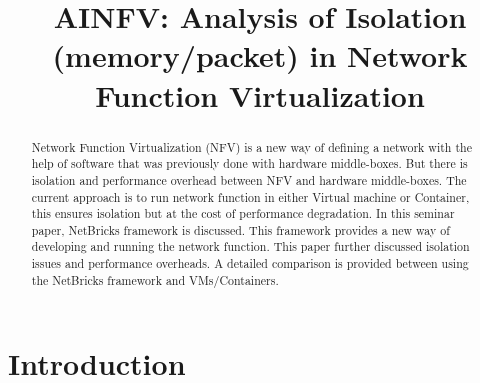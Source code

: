 \documentclass[10pt, a4paper, conference]{IEEEtran}
\begin{document}

\title{AINFV: Analysis of Isolation (memory/packet) in Network Function Virtualization }
% 


\author{
  
}

\maketitle

\begin{abstract}
Network Function Virtualization (NFV) is a new way of defining a network with the help of software that was previously done with hardware middle-boxes. But there is isolation and performance overhead between NFV and hardware middle-boxes. The current approach is to run network function in either Virtual machine or Container, this ensures isolation but at the cost of performance degradation. In this seminar paper, NetBricks framework is discussed. This framework provides a new way of developing and running the network function. This paper further discussed isolation issues and performance overheads. A detailed comparison is provided between using the NetBricks framework and VMs/Containers.   
\end{abstract}



%
\IEEEpeerreviewmaketitle


\section{Introduction }
\label{sec:intro}
\end{document}
